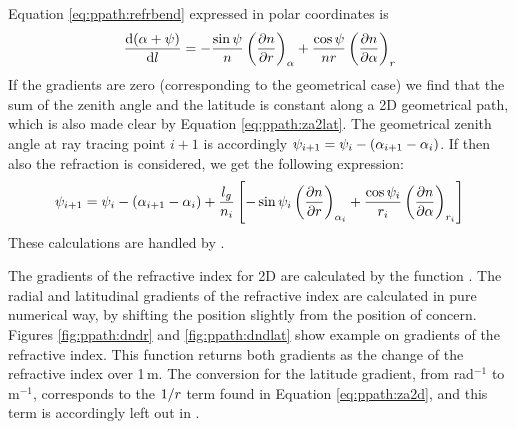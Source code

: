 Equation \ref{eq:ppath:refrbend} expressed in polar coordinates
is \citep[Eq. 9.30]{rodgers:00}
\begin{equation}
  \frac{\mathrm{d}(\alpha+\psi)}{\mathrm{d} l} = 
    -\frac{\sin\psi}{n} \left( \frac{\partial n}{\partial r} \right)_{\alpha}
    +\frac{\cos\psi}{nr} \left( \frac{\partial n}{\partial \alpha} \right)_{r}
  \label{eq:ppath:refrbend2d}
\end{equation}
If the gradients are zero (corresponding to the geometrical case) we
find that the sum of the zenith angle and the latitude is constant
along a 2D geometrical path, which is also made clear by
Equation \ref{eq:ppath:za2lat}. The geometrical zenith angle at ray
tracing point $i+1$ is accordingly $\psi_{i+1} = \psi_{i} -
(\alpha_{i+1}-\alpha_{i})$. If then also the refraction is considered, we
get the following expression:
\begin{equation}
  \psi_{i+1} = \psi_{i} - (\alpha_{i+1}-\alpha_{i}) + \frac{l_g}{n_i}
   \left[
    -\sin\psi_{i} \left( \frac{\partial n}{\partial r} \right)_{\alpha_{i}}
    +\frac{\cos\psi_{i}}{r_{i}} 
                \left( \frac{\partial n}{\partial \alpha} \right)_{r_{i}}
  \right]  
  \label{eq:ppath:za2d}
\end{equation}
These calculations are handled by .

The gradients of the refractive index for 2D are calculated by the function
. The radial and latitudinal gradients of the
refractive index are calculated in pure numerical way, by shifting the position
slightly from the position of concern. Figures \ref{fig:ppath:dndr} and
\ref{fig:ppath:dndlat} show example on gradients of the refractive index. This
function returns both gradients as the change of the refractive index over
1\,m. The conversion for the latitude gradient, from rad$^{-1}$ to m$^{-1}$,
corresponds to the $1/r$ term found in Equation \ref{eq:ppath:za2d}, and
this term is accordingly left out in .





